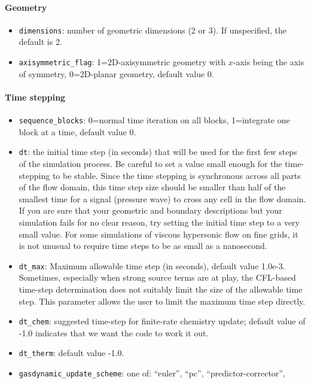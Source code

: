 \paragraph{Geometry}
\begin{itemize}
\item \texttt{dimensions}: number of geometric dimensions (2 or 3).  
  If unspecified, the default is 2.
\item \texttt{axisymmetric\_flag}: 1=2D-axisymmetric geometry with $x$-axis being the axis of symmetry,
  0=2D-planar geometry, default value 0.
\end{itemize}

\paragraph{Time stepping}
\begin{itemize}
\item \texttt{sequence\_blocks}: 0=normal time iteration on all blocks, 1=integrate one block
  at a time, default value 0.
\item \texttt{dt}\ddag: the initial time step (in seconds) that will be used for the
  first few steps of the simulation process.
  Be careful to set a value small enough for the time-stepping to be stable.
  Since the time stepping is synchronous across all parts of the flow domain,
  this time step size should be smaller than half of the smallest time for a signal
  (pressure wave) to cross any cell in the flow domain. 
  If you are sure that your geometric and boundary descriptions but your simulation
  fails for no clear reason, try setting the initial time step to a very small value.
  For some simulations of viscous hypersonic flow on fine grids, 
  it is not unusual to require time steps to be as small as a nanosecond.
\item \texttt{dt\_max}\ddag: Maximum allowable time step (in seconds),
 default value 1.0e-3.
 Sometimes, especially when strong source terms are at play, the CFL-based time-step 
 determination does not suitably limit the size of the allowable time step.
 This parameter allows the user to limit the maximum time step directly.
\item \texttt{dt\_chem}: suggested time-step for finite-rate chemistry update;
  default value of -1.0 indicates that we want the code to work it out.
\item \texttt{dt\_therm}: default value -1.0.
\item \texttt{gasdynamic\_update\_scheme}\ddag: one of: ``euler'', ``pc'', ``predictor-corrector'',

\end{itemize}
